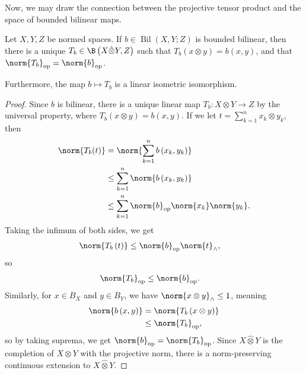 Now, we may draw the connection between the projective tensor product and the space of bounded bilinear maps.
\begin{proposition}
  Let $X,Y,Z$ be normed spaces. If $b\in \operatorname{Bil}\left( X,Y;Z \right)$ is bounded bilinear, then there is a unique $T_{b}\in \B\left( X\hat\otimes Y,Z \right)$ such that $T_b\left( x\otimes y \right)= b\left( x,y \right)$, and that $\norm{T_{b}}_{\op} = \norm{b}_{\op}$.\newline

  Furthermore, the map $b\mapsto T_b$ is a linear isometric isomorphism.
\end{proposition}
\begin{proof}
  Since $b$ is bilinear, there is a unique linear map $T_b\colon X\otimes Y \rightarrow Z$ by the universal property, where $T_b\left( x\otimes y \right) = b\left( x,y \right)$. If we let $t = \sum_{k=1}^{n}x_k\otimes y_k$, then
  \begin{align*}
    \norm{T_b(t)} &= \norm{\sum_{k=1}^{n}b\left( x_k,y_k \right)}\\
                  &\leq \sum_{k=1}^{n}\norm{b\left( x_k,y_k \right)}\\
                  &\leq \sum_{k=1}^{n}\norm{b}_{\op}\norm{x_k}\norm{y_k}.
  \end{align*}
  Taking the infimum of both sides, we get
  \begin{align*}
    \norm{T_b\left( t \right)} &\leq \norm{b}_{\op}\norm{t}_{\wedge},
  \end{align*}
  so
  \begin{align*}
    \norm{T_b}_{\op} &\leq \norm{b}_{\op}.
  \end{align*}
  Similarly, for $x\in B_X$ and $y\in B_Y$, we have $\norm{x\otimes y}_{\wedge}\leq 1$, meaning
  \begin{align*}
    \norm{b\left( x,y \right)} &= \norm{T_b\left( x\otimes y \right)}\\
                               &\leq \norm{T_b}_{\op},
  \end{align*}
  so by taking suprema, we get $\norm{b}_{\op} = \norm{T_b}_{\op}$. Since $X\hat\otimes Y$ is the completion of $X\otimes Y$ with the projective norm, there is a norm-preserving continuous extension to $X\hat\otimes Y$.\newline


\end{proof}

